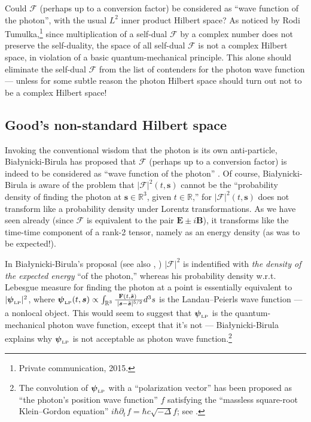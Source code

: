 \documentclass[11pt]{article}
\theoremstyle{definition}
\newcommand{\vect}[1] {\boldsymbol{{ #1}} }
\newcommand{\sV}{{\vect{s}}}            %
\newcommand{\FV}{\pmb{\mathcal{F}}}
\numberwithin{equation}{section}
\newcommand{\bB}{\mathbf{B}}
\newcommand{\bE}{\mathbf{E}}
\newcommand{\bF}{\mathbf{F}}
\newcommand{\psiLP}{{{\boldsymbol{\psi}}_{\mbox{\rm\tiny LP}}}}
\newcommand{\Rset}{{\mathbb R}}
\newcommand{\pdt}{{\partial_t^{\phantom{0}}}}
\begin{document}
 Could $\FV$ (perhaps up to a conversion factor) be considered as ``wave function of the photon'', with the usual $L^2$
inner product Hilbert space?
 {As noticed by Rodi Tumulka,\footnote{Private communication, 2015.} 
since multiplication of a self-dual $\FV$ by a complex number does not preserve the self-duality, 
the space of all self-dual $\FV$ is not a complex Hilbert space, in violation of a basic quantum-mechanical principle.
 This alone should eliminate the self-dual $\FV$ from the list of contenders for the photon wave function --- 
unless for some subtle reason the photon Hilbert space should turn out not to be a complex Hilbert space!}\vspace{-5pt}

\subsection{Good's non-standard Hilbert space}\label{sec:GOODnogood}\vspace{-5pt}

  Invoking the conventional wisdom that the photon is its own anti-particle, Bia\l{}ynicki-Birula has proposed that $\FV$ 
(perhaps up to a conversion factor) is indeed to be considered as ``wave function of the photon'' \cite{BiBiTHREE,IBBphotonREV}.
 Of course, Bia\l{}ynicki-Birula is aware of the problem that 
 $|{\FV}|^2(t,\sV)$ cannot be the ``probability density of finding the photon at $\sV\in\Rset^3$, given $t\in\Rset$,'' 
for $|{\FV}|^2(t,\sV)$ does not transform like a probability density under Lorentz transformations.
 As we have seen already (since $\FV$ is equivalent to the pair $\bE\pm i\bB$),
it transforms like the time-time component of a rank-2 tensor, namely as an energy density (as was to be expected!). 

 In Bia\l{}ynicki-Birula's proposal \cite{BiBiTHREE,IBBphotonREV} (see also \cite{IBBZBBphotonREV}, \cite{RedkovETal})
$|\FV|^2$ is indentified with \emph{the density of the expected energy} ``of the photon,'' 
whereas his probability density w.r.t. Lebesgue measure for finding the photon at a point is
essentially equivalent to $|\psiLP|^2$, where 
   $\psiLP(t,\sV) \propto \int_{\Rset^3}\frac{\!\!\bF(t,\tilde{\sV})}{\;|\sV - \tilde{\sV}|^{5/2}}d^3s$
is the Landau--Peierls wave function \cite{LandauPeierls} --- a nonlocal object. %
 This would seem to suggest that $\psiLP$ is the quantum-mechanical photon wave function, except that it's not
--- Bia\l{}ynicki-Birula explains why $\psiLP$ is not acceptable as photon wave function.\footnote{The convolution of $\psiLP$ 
   with a ``polarization vector'' has been proposed as ``the photon's position wave function'' $f$ 
satisfying the ``massless square-root Klein--Gordon equation'' $i\hbar \pdt f = \hbar c \sqrt{-\Delta} f$; see \cite{Mostafazadeh}.}
\end{document}
